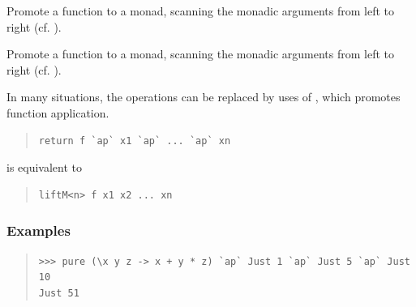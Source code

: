 \begin{haddockdesc}
\item[\begin{tabular}{@{}l}
liftM4 :: Monad m => (a1 -> a2 -> a3 -> a4 -> r) -> m a1 -> m a2 -> m a3 -> m a4 -> m r
\end{tabular}]
{\haddockbegindoc
Promote a function to a monad, scanning the monadic arguments from
 left to right (cf. ).\par}
\end{haddockdesc}
\begin{haddockdesc}
\item[\begin{tabular}{@{}l}
liftM5 :: Monad m =>\\\ \ \ \ \ \ \ \ \ \ (a1 -> a2 -> a3 -> a4 -> a5 -> r) -> m a1 -> m a2 -> m a3 -> m a4 -> m a5 -> m r
\end{tabular}]
{\haddockbegindoc
Promote a function to a monad, scanning the monadic arguments from
 left to right (cf. ).\par}
\end{haddockdesc}
\begin{haddockdesc}
\item[\begin{tabular}{@{}l}
ap :: Monad m => m (a -> b) -> m a -> m b
\end{tabular}]
{\haddockbegindoc
In many situations, the  operations can be replaced by uses of
, which promotes function application.\par
\begin{quote}
{\haddockverb\begin{verbatim}
return f `ap` x1 `ap` ... `ap` xn\end{verbatim}}
\end{quote}
is equivalent to\par
\begin{quote}
{\haddockverb\begin{verbatim}
liftM<n> f x1 x2 ... xn\end{verbatim}}
\end{quote}
\subsubsection*{\textbf{Examples}}
\begin{quote}
{\haddockverb\begin{verbatim}
>>> pure (\x y z -> x + y * z) `ap` Just 1 `ap` Just 5 `ap` Just 10
Just 51

\end{verbatim}}
\end{quote}}
\end{haddockdesc}